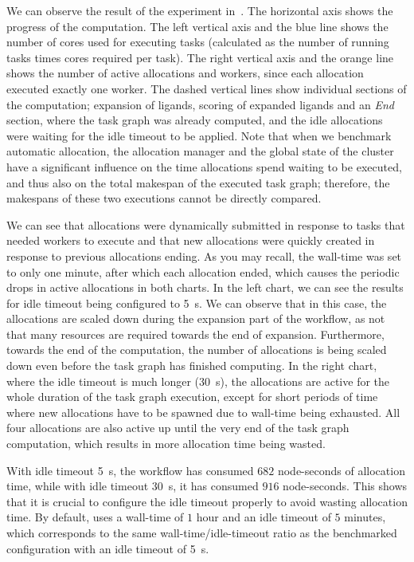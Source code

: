 We can observe the result of the experiment in~. The horizontal axis shows
the progress of the computation. The left vertical axis and the blue line shows the number of cores
used for executing tasks (calculated as the number of running tasks times cores required per task).
The right vertical axis and the orange line shows the number of active allocations and workers,
since each allocation executed exactly one worker. The dashed vertical lines show individual
sections of the computation; expansion of ligands, scoring of expanded ligands and an
\emph{End} section, where the task graph was already computed, and the idle
allocations were waiting for the idle timeout to be applied. Note that when we benchmark automatic
allocation, the allocation manager and the global state of the cluster have a significant influence
on the time allocations spend waiting to be executed, and thus also on the total makespan of the
executed task graph; therefore, the makespans of these two executions cannot be directly compared.

We can see that allocations were dynamically submitted in response to tasks that needed workers to
execute and that new allocations were quickly created in response to previous allocations ending.
As you may recall, the wall-time was set to only one minute, after which each allocation ended,
which causes the periodic drops in active allocations in both charts. In the left chart, we can see
the results for idle timeout being configured to \SI{5}{\second}. We can observe that in
this case, the allocations are scaled down during the expansion part of the workflow, as not that
many resources are required towards the end of expansion. Furthermore, towards the end of the
computation, the number of allocations is being scaled down even before the task graph has finished
computing. In the right chart, where the idle timeout is much longer (\SI{30}{\second}),
the allocations are active for the whole duration of the task graph execution, except for short
periods of time where new allocations have to be spawned due to wall-time being exhausted. All four
allocations are also active up until the very end of the task graph computation, which results in
more allocation time being wasted.

With idle timeout \SI{5}{\second}, the workflow has consumed $682$
node-seconds of allocation time, while with idle timeout \SI{30}{\second}, it has consumed
$916$ node-seconds. This shows that it is crucial to configure the idle timeout
properly to avoid wasting allocation time. By default, \hyperqueue{} uses a wall-time of
$1$ hour and an idle timeout of $5$ minutes, which
corresponds to the same wall-time/idle-timeout ratio as the benchmarked configuration with an idle
timeout of \SI{5}{\second}.

